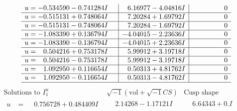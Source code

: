\documentclass[1p]{elsarticle_modified}
\theoremstyle{definition}
\newcommand{\I}{\sqrt{-1}}
\begin{document}
$$\begin{array}{c|c|c}
\begin{aligned}
u &= -0.534590 - 0.741284 I\end{aligned}
 & \phantom{-}6.16977 - 4.04816 I & \phantom{-0.000000 } 0 \\ \hline\begin{aligned}
u &= -0.515131 + 0.748064 I\end{aligned}
 & \phantom{-}7.20284 + 1.69792 I & \phantom{-0.000000 } 0 \\ \hline\begin{aligned}
u &= -0.515131 - 0.748064 I\end{aligned}
 & \phantom{-}7.20284 - 1.69792 I & \phantom{-0.000000 } 0 \\ \hline\begin{aligned}
u &= -1.083390 + 0.136794 I\end{aligned}
 & -4.04015 - 2.23636 I & \phantom{-0.000000 } 0 \\ \hline\begin{aligned}
u &= -1.083390 - 0.136794 I\end{aligned}
 & -4.04015 + 2.23636 I & \phantom{-0.000000 } 0 \\ \hline\begin{aligned}
u &= \phantom{-}0.504216 + 0.753178 I\end{aligned}
 & \phantom{-}5.99912 + 3.19718 I & \phantom{-0.000000 } 0 \\ \hline\begin{aligned}
u &= \phantom{-}0.504216 - 0.753178 I\end{aligned}
 & \phantom{-}5.99912 - 3.19718 I & \phantom{-0.000000 } 0 \\ \hline\begin{aligned}
u &= \phantom{-}1.092950 + 0.116654 I\end{aligned}
 & \phantom{-}0.50313 + 4.81762 I & \phantom{-0.000000 } 0 \\ \hline\begin{aligned}
u &= \phantom{-}1.092950 - 0.116654 I\end{aligned}
 & \phantom{-}0.50313 - 4.81762 I & \phantom{-0.000000 } 0\\
 \hline 
 \end{array}$$\newpage$$\begin{array}{c|c|c}  
\text{Solutions to }I^u_{1}& \I (\text{vol} + \sqrt{-1}CS) & \text{Cusp shape}\\
 \hline 
\begin{aligned}
u &= \phantom{-}0.756728 + 0.484409 I\end{aligned}
 & \phantom{-}2.14268 - 1.17121 I & \phantom{-}6.64343 + 0. I\phantom{ +0.000000I} \\ \hline\begin{aligned}

\end{aligned}
\end{array}$$
\end{document}
